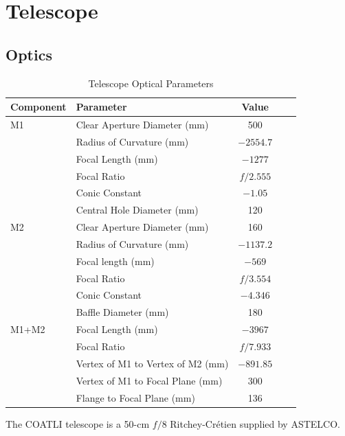 
\chapter{Telescope}
\label{chapter:telescope}

\section{Optics}

\begin{table}
\begin{center}
\caption{Telescope Optical Parameters}
\label{table:telescope-optical-parameters}
\medskip
\footnotesize
\begin{tabular}{llccc}
\hline
\hline
Component&Parameter&Value\\
\hline
M1
&Clear Aperture Diameter (mm)     &500\\
&Radius of Curvature (mm)         &$-2554.7$\\
&Focal Length (mm)&$-1277$\\
&Focal Ratio                      &$f/2.555$\\
&Conic Constant                   &$-1.05$\\
&Central Hole Diameter (mm)       &120\\
\hline
M2
&Clear Aperture Diameter (mm)     &160\\
&Radius of Curvature (mm)         &$-1137.2$\\
&Focal length (mm) &$-569$\\
&Focal Ratio                      &$f/3.554$\\
&Conic Constant                   &$-4.346$\\
&Baffle Diameter (mm)             &180\\
\hline
M1+M2 
&Focal Length (mm)&$-3967$\\
&Focal Ratio&$f/7.933$\\
&Vertex of M1 to Vertex of M2 (mm)&$-891.85$\\
&Vertex of M1 to Focal Plane (mm) &300\\
&Flange to Focal Plane (mm)       &136\\
\hline
\end{tabular}
\end{center}
\end{table}

The COATLI telescope is a 50-cm $f/8$ Ritchey-Crétien supplied by ASTELCO. 

